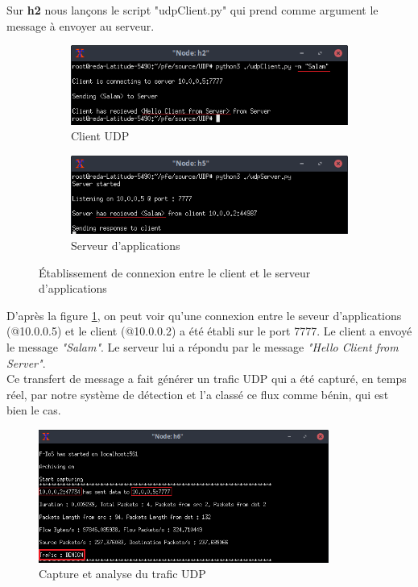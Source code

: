 Sur \textbf{h2} nous lançons le script "udpClient.py" qui prend comme argument le message à envoyer au serveur.
\begin{figure}[h]
\centering
\begin{subfigure}{12.5cm}
\centering
\includegraphics[width=\textwidth]{Figures/simulation/mininet/UDP/client/Benign}
\caption{Client UDP}
\end{subfigure}
\vskip 0.4cm
\begin{subfigure}{12.5cm}
\centering
\includegraphics[width=\textwidth]{Figures/simulation/mininet/UDP/server/benign_request}
\caption{Serveur d'applications}
\end{subfigure}
\vskip 0.3cm
\decoRule
\caption{Établissement de connexion entre le client et le serveur d'applications}
\label{fig:c/s_UDP}
\end{figure}
\newpage
D'après la figure \ref{fig:c/s_UDP}, on peut voir qu'une connexion entre le seveur d'applications (@10.0.0.5) et le client (@10.0.0.2) a été établi sur le port 7777. Le client a envoyé le message \textit{"Salam"}. Le serveur lui a répondu par le message \textit{"Hello Client from Server"}. \\
Ce transfert de message a fait générer un trafic UDP qui a été capturé, en temps réel, par notre système de détection et l'a classé ce flux comme bénin, qui est bien le cas. 
\begin{figure}[h]
\centering
\includegraphics[width=0.85\textwidth]{Figures/simulation/mininet/IDS/benign_udp}
\decoRule
\caption{Capture et analyse du trafic UDP}
\label{fig:udpTraffic}
\end{figure}
